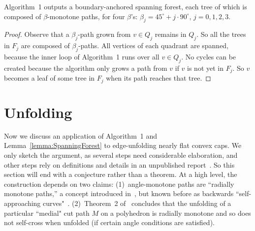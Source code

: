\documentclass{cccg17}
\newcommand{\bluenew}[1]{{#1}}  %
\newcommand{\rednote}[1]{{}}  %
\newcommand{\lemlab}[1]{\label{lemma:#1}}
\newcommand{\seclab}[1]{\label{sec:#1}}
\newcommand{\lemref}[1]{\ref{lemma:#1}}
\def\b{{\beta}}
\begin{document}
\rednote{Rev1:
``For $j=0,1,2,3$, the trees in $Q_j$ are monotone with respect to the angle $225^\circ + j \cdot 90^\circ$ and not with respect to the angle $45^\circ + j \cdot 90^\circ$ (if I got the definition of $\beta$-monotone trees right and the paths go from the source to the nodes).
JOR: I think this is splitting hairs. The paths are at $45^\circ + j \cdot 90^\circ$, but,
yes, the trees are aimed the other way.}


\rednote{Rev1:
``In the description of Algorithm 1 output and in the statement of Lemma 8, one gets the false impression that the forest is composed of connected components which are paths."
JOR: Certainly the figure removes that confusion, but I added clarification.}

\begin{lemma}
Algorithm~1 outputs a boundary-anchored spanning forest,
\bluenew{each tree of which is}
composed of $\b$-monotone paths, for four $\b$'s:
$\b_j = 45^\circ + j \cdot 90^\circ$, $j=0,1,2,3$.
\lemlab{SpanningForest}
\end{lemma}
\begin{proof}
Observe that a $\b_j$-path grown from $v \in Q_j$ remains in $Q_j$.
So all the trees in $F_j$ are composed of $\b_j$-paths.
All vertices of each quadrant are spanned, because the inner loop
of Algorithm~1 runs over all $v \in Q_j$.
No cycles can be created because the algorithm only grows
a path from $v$ if $v$ is not yet in $F_j$. So $v$ becomes a leaf
of some tree in $F_j$ when its path reaches that tree.
\end{proof}

\section{Unfolding}
\seclab{Unfolding}
Now we \bluenew{discuss} an application of Algorithm~1 and Lemma~\lemref{SpanningForest}
to edge-unfolding nearly flat convex caps.
We \bluenew{only} sketch the argument, 
\bluenew{as several steps need considerable elaboration, and other steps rely}
on definitions and 
details in an unpublished report~\cite{o-ucprm-16}.
So this section will end with a conjecture rather than a theorem.
At a high level, the construction depends on two claims:
(1)~angle-monotone paths are ``radially monotone paths,'' a concept introduced
in~\cite{o-ucprm-16}, but known before as backwards ``self-approaching curves"~\cite{ikl-sac-99}.
(2)~Theorem~2 %
of~\cite{o-ucprm-16} concludes that the unfolding
of a particular ``medial" cut path $M$ on a polyhedron is radially monotone and so does not self-cross
when unfolded
(if certain angle conditions are satisfied).
\end{document}
